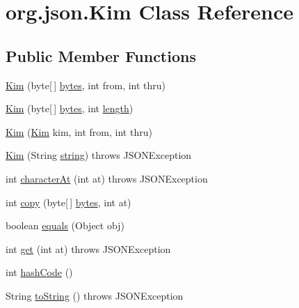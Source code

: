 \hypertarget{classorg_1_1json_1_1_kim}{\section{org.\-json.\-Kim Class Reference}
\label{classorg_1_1json_1_1_kim}
}
\subsection*{Public Member Functions}
\begin{DoxyCompactItemize}
\item 
\hyperlink{classorg_1_1json_1_1_kim_a44b367e21f41746f63b7fc61c32ed259}{Kim} (byte\mbox{[}$\,$\mbox{]} \hyperlink{classorg_1_1json_1_1_kim_aca37e9b2f118afc91bc8d1f37512819b}{bytes}, int from, int thru)
\item 
\hyperlink{classorg_1_1json_1_1_kim_a397d63cbb42efcb488dd5fc6c7815fa1}{Kim} (byte\mbox{[}$\,$\mbox{]} \hyperlink{classorg_1_1json_1_1_kim_aca37e9b2f118afc91bc8d1f37512819b}{bytes}, int \hyperlink{classorg_1_1json_1_1_kim_a6caa186b493021e083e4efbf734e3a40}{length})
\item 
\hyperlink{classorg_1_1json_1_1_kim_a798dc70a0b04e45bf2afce778c7151c3}{Kim} (\hyperlink{classorg_1_1json_1_1_kim}{Kim} kim, int from, int thru)
\item 
\hyperlink{classorg_1_1json_1_1_kim_a652b4e6a919d52344c0e324348b577c4}{Kim} (String \hyperlink{classorg_1_1json_1_1_kim_ab3c21a745d0601eb36105ec3769a310a}{string})  throws J\-S\-O\-N\-Exception 
\item 
int \hyperlink{classorg_1_1json_1_1_kim_ac3c5fafa8f35357441582a217e2288ff}{character\-At} (int at)  throws J\-S\-O\-N\-Exception 
\item 
int \hyperlink{classorg_1_1json_1_1_kim_a2fee1848d7208b970312e02549323ef7}{copy} (byte\mbox{[}$\,$\mbox{]} \hyperlink{classorg_1_1json_1_1_kim_aca37e9b2f118afc91bc8d1f37512819b}{bytes}, int at)
\item 
boolean \hyperlink{classorg_1_1json_1_1_kim_a1ccd8538e3fa847b407f2192f54b71c4}{equals} (Object obj)
\item 
int \hyperlink{classorg_1_1json_1_1_kim_aef6fa7d8ec3cf6fc01858405479251d7}{get} (int at)  throws J\-S\-O\-N\-Exception 
\item 
int \hyperlink{classorg_1_1json_1_1_kim_aba38c33cd6a7b21a039c888b092763c2}{hash\-Code} ()
\item 
String \hyperlink{classorg_1_1json_1_1_kim_aebfdbe281cc48dd341c1a24e389d5b89}{to\-String} ()  throws J\-S\-O\-N\-Exception 
\end{DoxyCompactItemize}
